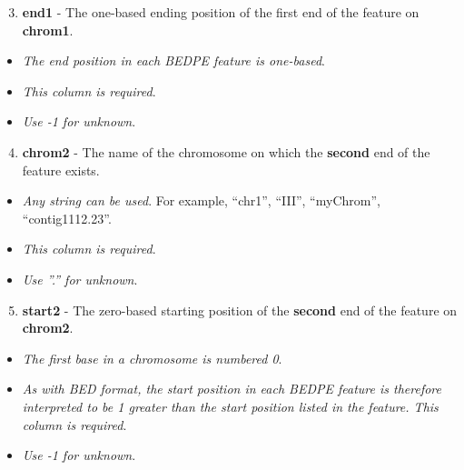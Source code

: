 \documentclass[letterpaper,10pt,english]{sphinxmanual}
\begin{document}
\begin{enumerate}
\setcounter{enumi}{2}
\item {} 
\textbf{end1} - The one-based ending position of the first end of the feature on \textbf{chrom1}.

\end{enumerate}
\begin{itemize}
\item {} 
\emph{The end position in each BEDPE feature is one-based}.

\item {} 
\emph{This column is required}.

\item {} 
\emph{Use -1 for unknown}.

\end{itemize}
\begin{enumerate}
\setcounter{enumi}{3}
\item {} 
\textbf{chrom2} - The name of the chromosome on which the \textbf{second} end of the feature exists.

\end{enumerate}
\begin{itemize}
\item {} 
\emph{Any string can be used}. For example, ``chr1'', ``III'', ``myChrom'', ``contig1112.23''.

\item {} 
\emph{This column is required}.

\item {} 
\emph{Use ''.'' for unknown}.

\end{itemize}
\begin{enumerate}
\setcounter{enumi}{4}
\item {} 
\textbf{start2} - The zero-based starting position of the \textbf{second} end of the feature on \textbf{chrom2}.

\end{enumerate}
\begin{itemize}
\item {} 
\emph{The first base in a chromosome is numbered 0}.

\item {} 
\emph{As with BED format, the start position in each BEDPE feature is therefore interpreted to be 1 greater than the start position listed in the feature. This column is required}.

\item {} 
\emph{Use -1 for unknown}.

\end{itemize}
\end{document}
